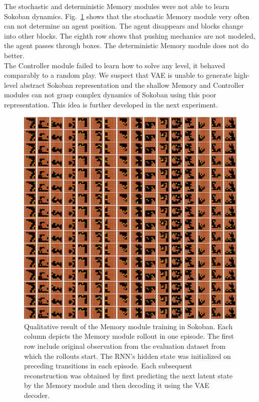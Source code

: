 The stochastic and deterministic Memory modules were not able to learn Sokoban dynamics. Fig.~\ref{Fig.WM_Sokoban_memory} shows that the stochastic Memory module very often can not determine an agent position. The agent disappears and blocks change into other blocks. The eighth row shows that pushing mechanics are not modeled, the agent passes through boxes. The deterministic Memory module does not do better. \\
The Controller module failed to learn how to solve any level, it behaved comparably to a random play. We suspect that VAE is unable to generate high-level abstract Sokoban representation and the shallow Memory and Controller modules can not grasp complex dynamics of Sokoban using this poor representation. This idea is further developed in the next experiment.

\begin{figure}[H]
\includegraphics[width=1\textwidth,keepaspectratio]{figures/Sokoban_memory.png}
\caption[Qualitative result of the World Models' Memory module training in Sokoban]{Qualitative result of the Memory module training in Sokoban. Each column depicts the Memory module rollout in one episode. The first row include original observation from the evaluation dataset from which the rollouts start. The RNN's hidden state was initialized on preceding transitions in each episode. Each subsequent reconstruction was obtained by first predicting the next latent state by the Memory module and then decoding it using the VAE decoder.}
\label{Fig.WM_Sokoban_memory}
\end{figure}

